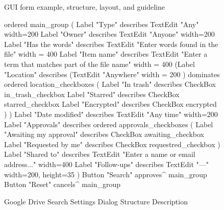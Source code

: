 \begin{figure}[t]
{{}}
\vskip5mm

\caption{GUI form example, structure, layout, and guideline}
\label{form1-structure-layout}
\end{figure}



\begin{figure}[t]
\begin{verbnobox}[\fontsize{10pt}{10pt}\selectfont]
ordered main_group (
  Label "Type" describes TextEdit "Any" { width=200 }
  Label "Owner" describes TextEdit "Anyone" { width=200 }
  Label "Has the words" describes TextEdit "Enter words found in the file" {
   width = 400
  }
  Label "Item name" describes
    TextEdit "Enter a term that matches part of the file name" {
      width = 400
    }
  (Label "Location" describes
    (TextEdit "Anywhere" { width = 200 }) dominates
    ordered location_checkboxes (
      Label "In trash"  describes CheckBox in_trash_checkbox
      Label "Starred"   describes CheckBox starred_checkbox
      Label "Encrypted" describes CheckBox encrypted
    )
  )
  Label "Date modified" describes  TextEdit "Any time" { width=200 }
  Label "Approvals" describes
    ordered approvals_checkboxes (
      Label "Awaiting my approval" describes CheckBox awaiting_checkbox
      Label "Requested by me" describes CheckBox requestred_checkbox
  )
  Label "Shared to" describes
    TextEdit "Enter a name or email address..." { width=400 }
  Label "Follow-ups" describes TextEdit "---" { width=200, height=35 }
)
Button "Search" approves^ main_group
Button "Reset" cancels^ main_group
\end{verbnobox}
\caption{Google Drive Search Settings Dialog Structure Description}
\label{gd_structure}
\end{figure}

